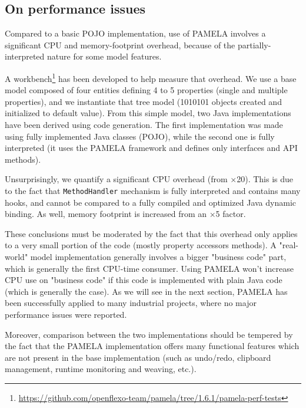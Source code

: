 
\subsection{On performance issues}

Compared to a basic POJO implementation, use of PAMELA involves a significant CPU and memory-footprint overhead, because of the partially-interpreted nature for some model features.

A workbench\footnote {\url{https://github.com/openflexo-team/pamela/tree/1.6.1/pamela-perf-tests}} has been developed to help measure that overhead. We use a base model composed of four entities defining 4 to 5 properties (single and multiple properties), and we instantiate that tree model (1010101 objects created and initialized to default value). From this simple model, two Java implementations have been derived using code generation. The first implementation was made using fully implemented Java classes (POJO), while the second one is fully interpreted (it uses the PAMELA framework and defines only interfaces and API methods). 

Unsurprisingly, we quantify a significant CPU overhead (from $\times$20). This is due to the fact that \texttt{MethodHandler} mechanism is fully interpreted and contains many hooks, and cannot be compared to a fully compiled and optimized Java dynamic binding. As well, memory footprint is increased from an 
$\times$5 factor.

These conclusions must be moderated by the fact that this overhead only applies
to a very small portion of the code (mostly property accessors methods). A "real-world" model implementation generally involves a bigger "business code" part, which is generally the first CPU-time consumer. Using PAMELA won’t increase CPU use on "business code" if this code is implemented with plain Java code (which is generally the case). As we will see in the next section, PAMELA has been successfully applied to many industrial projects, where no major performance issues were reported.

Moreover, comparison between the two implementations should be tempered by the fact that the PAMELA implementation offers many functional features which are not present in the base implementation (such as undo/redo, clipboard management, runtime monitoring and weaving, etc.).


